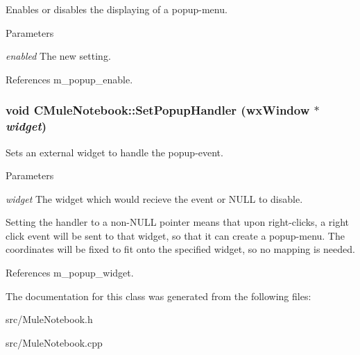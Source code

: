 Enables or disables the displaying of a popup-\/menu. 
\begin{DoxyParams}{Parameters}
\item[{\em enabled}]The new setting. \end{DoxyParams}


References m\_\-popup\_\-enable.
\subsubsection[{SetPopupHandler}]{\setlength{\rightskip}{0pt plus 5cm}void CMuleNotebook::SetPopupHandler (wxWindow $\ast$ {\em widget})}\label{classCMuleNotebook_a2d2c4a316536e3275b3bf90b8eb6052b}


Sets an external widget to handle the popup-\/event. 
\begin{DoxyParams}{Parameters}
\item[{\em widget}]The widget which would recieve the event or NULL to disable.\end{DoxyParams}
Setting the handler to a non-\/NULL pointer means that upon right-\/clicks, a right click event will be sent to that widget, so that it can create a popup-\/menu. The coordinates will be fixed to fit onto the specified widget, so no mapping is needed. 

References m\_\-popup\_\-widget.

The documentation for this class was generated from the following files:\begin{DoxyCompactItemize}
\item 
src/MuleNotebook.h\item 
src/MuleNotebook.cpp\end{DoxyCompactItemize}
